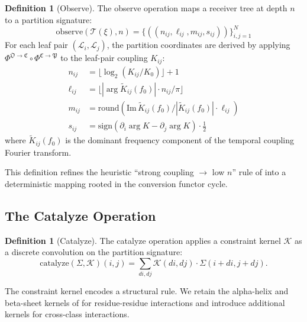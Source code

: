 \documentclass[11pt,twocolumn,a4paper]{article}
\theoremstyle{definition}
\newtheorem{definition}[theorem]{Definition}
\theoremstyle{remark}
\newcommand{\Osc}{\mathfrak{O}}
\newcommand{\Cat}{\mathfrak{C}}
\newcommand{\Part}{\mathfrak{P}}
\newcommand{\Sexp}{\xi}
\newcommand{\catalyst}{\mathcal{K}}
\newcommand{\Sig}{\Sigma}
\newcommand{\Leaf}{\mathcal{L}}
\newcommand{\Tree}{\mathcal{T}}
\begin{document}
\begin{definition}[Observe]
\label{def:observe}
The observe operation maps a receiver tree at depth $n$ to a partition signature:
\begin{equation}
\mathrm{observe}(\Tree(\Sexp), n) = \{((n_{ij}, \ell_{ij}, m_{ij}, s_{ij}))\}_{i, j = 1}^N
\end{equation}
For each leaf pair $(\Leaf_i, \Leaf_j)$, the partition coordinates are derived by applying $\Phi^{\Osc \to \Cat} \circ \Phi^{\Cat \to \Part}$ to the leaf-pair coupling $K_{ij}$:
\begin{align}
n_{ij} &= \lfloor \log_2(K_{ij} / K_0) \rfloor + 1 \\
\ell_{ij} &= \lfloor |\arg \tilde{K}_{ij}(f_0)| \cdot n_{ij} / \pi \rfloor \\
m_{ij} &= \mathrm{round}(\mathrm{Im}\, \tilde{K}_{ij}(f_0) / |\tilde{K}_{ij}(f_0)| \cdot \ell_{ij}) \\
s_{ij} &= \mathrm{sign}(\partial_i \arg K - \partial_j \arg K) \cdot \tfrac{1}{2}
\end{align}
where $\tilde{K}_{ij}(f_0)$ is the dominant frequency component of the temporal coupling Fourier transform.
\end{definition}

This definition refines the heuristic ``strong coupling $\to$ low $n$'' rule of \citep{sachikonye2025fold} into a deterministic mapping rooted in the conversion functor cycle.

\subsection{The Catalyze Operation}

\begin{definition}[Catalyze]
\label{def:catalyze}
The catalyze operation applies a constraint kernel $\catalyst$ as a discrete convolution on the partition signature:
\begin{equation}
\mathrm{catalyze}(\Sig, \catalyst)(i, j) = \sum_{di, dj} \catalyst(di, dj) \cdot \Sig(i + di, j + dj).
\end{equation}
\end{definition}

The constraint kernel encodes a structural rule. We retain the alpha-helix and beta-sheet kernels of \citep{sachikonye2025fold} for residue-residue interactions and introduce additional kernels for cross-class interactions.
\end{document}
